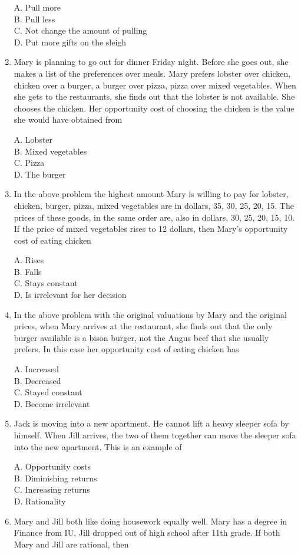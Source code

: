 \documentclass[
]{book}
\begin{document}
\begin{enumerate}
  A. Pull more\\
  B. Pull less\\
  C. Not change the amount of pulling\\
  D. Put more gifts on the sleigh
\item
  Mary is planning to go out for dinner Friday night. Before she goes out, she makes a list of the preferences over meals. Mary prefers lobster over chicken, chicken over a burger, a burger over pizza, pizza over mixed vegetables. When she gets to the restaurants, she finds out that the lobster is not available. She chooses the chicken. Her opportunity cost of choosing the chicken is the value she would have obtained from

  A. Lobster\\
  B. Mixed vegetables\\
  C. Pizza\\
  D. The burger
\item
  In the above problem the highest amount Mary is willing to pay for lobster, chicken, burger, pizza, mixed vegetables are in dollars, 35, 30, 25, 20, 15. The prices of these goods, in the same order are, also in dollars, 30, 25, 20, 15, 10. If the price of mixed vegetables rises to 12 dollars, then Mary's opportunity cost of eating chicken

  A. Rises\\
  B. Falls\\
  C. Stays constant\\
  D. Is irrelevant for her decision
\item
  In the above problem with the original valuations by Mary and the original prices, when Mary arrives at the restaurant, she finds out that the only burger available is a bison burger, not the Angus beef that she usually prefers. In this case her opportunity cost of eating chicken has

  A. Increased\\
  B. Decreased\\
  C. Stayed constant\\
  D. Become irrelevant
\item
  Jack is moving into a new apartment. He cannot lift a heavy sleeper sofa by himself. When Jill arrives, the two of them together can move the sleeper sofa into the new apartment. This is an example of

  A. Opportunity costs\\
  B. Diminishing returns\\
  C. Increasing returns\\
  D. Rationality
\item
  Mary and Jill both like doing housework equally well. Mary has a degree in Finance from IU, Jill dropped out of high school after 11th grade. If both Mary and Jill are rational, then


\end{enumerate}
\end{document}

